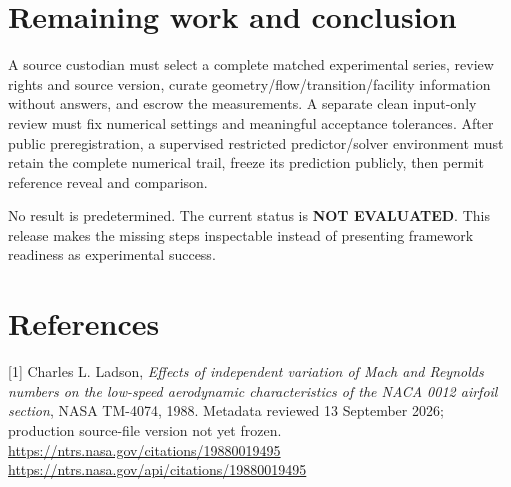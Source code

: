 \documentclass[10pt]{article}
\begin{document}
\section{Remaining work and conclusion}
A source custodian must select a complete matched experimental series, review rights and source version, curate geometry/flow/transition/facility information without answers, and escrow the measurements. A separate clean input-only review must fix numerical settings and meaningful acceptance tolerances. After public preregistration, a supervised restricted predictor/solver environment must retain the complete numerical trail, freeze its prediction publicly, then permit reference reveal and comparison.

No result is predetermined. The current status is \textbf{NOT EVALUATED}. This release makes the missing steps inspectable instead of presenting framework readiness as experimental success.
\section{References}
[1] Charles L. Ladson, \emph{Effects of independent variation of Mach and Reynolds numbers on the low-speed aerodynamic characteristics of the NACA 0012 airfoil section}, NASA TM-4074, 1988. Metadata reviewed 13 September 2026; production source-file version not yet frozen.\\
\url{https://ntrs.nasa.gov/citations/19880019495}\\
\url{https://ntrs.nasa.gov/api/citations/19880019495}
\end{document}
